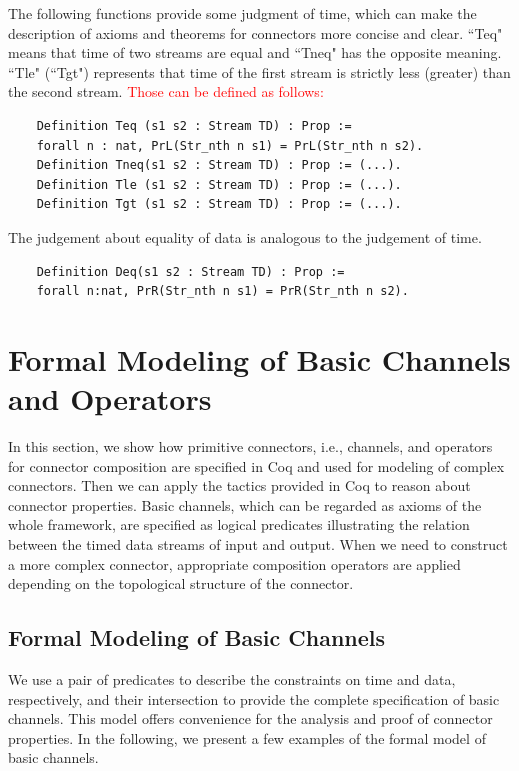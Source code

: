 \documentclass{llncs}
\newcommand{\redt}[1]{\textcolor{red}{#1}}
\begin{document}
The following functions provide some judgment of time, which can make
the description of axioms and theorems for connectors more concise and
clear. ``Teq" means that time of two streams are equal and ``Tneq" has the
opposite meaning. ``Tle"  (``Tgt") represents that time of the first stream is
strictly less (greater) than the second stream. \redt{Those can be defined as follows:}
\begin{verbatim}
    Definition Teq (s1 s2 : Stream TD) : Prop :=
    forall n : nat, PrL(Str_nth n s1) = PrL(Str_nth n s2).
    Definition Tneq(s1 s2 : Stream TD) : Prop := (...).
    Definition Tle (s1 s2 : Stream TD) : Prop := (...).
    Definition Tgt (s1 s2 : Stream TD) : Prop := (...).
\end{verbatim}
The judgement about equality of data is analogous to the judgement of time.
\begin{verbatim}
    Definition Deq(s1 s2 : Stream TD) : Prop :=
    forall n:nat, PrR(Str_nth n s1) = PrR(Str_nth n s2).
\end{verbatim}

\section{Formal Modeling of Basic Channels and Operators}\label{sec:channelandoperator}
In this section, we show how primitive connectors, i.e., channels, and operators for connector composition are specified in Coq and used for modeling of complex connectors. Then we can apply the tactics provided in Coq to reason about connector properties. Basic channels, which can be regarded as axioms of the whole framework, are specified as logical predicates illustrating the relation between the timed data streams of input and output. When we need to construct a more complex connector, appropriate composition operators are applied depending on the topological structure of the connector.

\subsection{Formal Modeling of Basic Channels}

We use a pair of predicates to describe the constraints on time and data, respectively, and their intersection to provide the complete specification of basic channels. This model offers convenience for the analysis and proof of connector properties. In the following, we present a few examples of the formal model of basic channels.
\end{document}
